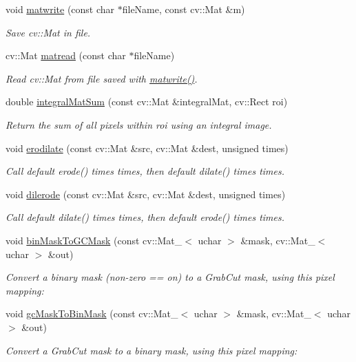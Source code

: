 \begin{DoxyCompactItemize}
void \hyperlink{namespacecvutils_a065c3fe57f6f80cd6a4ba369f3f5a635}{matwrite} (const char $\ast$file\-Name, const cv\-::\-Mat \&m)
\begin{DoxyCompactList}\small\item\em Save cv\-::\-Mat in file. \end{DoxyCompactList}\item 
cv\-::\-Mat \hyperlink{namespacecvutils_ad6c54561b8064273ce92dc34fd8d5c06}{matread} (const char $\ast$file\-Name)
\begin{DoxyCompactList}\small\item\em Read cv\-::\-Mat from file saved with {\ttfamily \hyperlink{namespacecvutils_a065c3fe57f6f80cd6a4ba369f3f5a635}{matwrite()}}. \end{DoxyCompactList}\item 
double \hyperlink{namespacecvutils_a5a05bf26e8f5d1309e36ba3596618c7e}{integral\-Mat\-Sum} (const cv\-::\-Mat \&integral\-Mat, cv\-::\-Rect roi)
\begin{DoxyCompactList}\small\item\em Return the sum of all pixels within {\ttfamily roi} using an integral image. \end{DoxyCompactList}\item 
void \hyperlink{namespacecvutils_adaaa279a13adf2231b2985a5313ef446}{erodilate} (const cv\-::\-Mat \&src, cv\-::\-Mat \&dest, unsigned times)
\begin{DoxyCompactList}\small\item\em Call default {\ttfamily erode()} {\ttfamily times} times, then default {\ttfamily dilate()} {\ttfamily times} times. \end{DoxyCompactList}\item 
void \hyperlink{namespacecvutils_a940f4f576e232256718ac607138d1a03}{dilerode} (const cv\-::\-Mat \&src, cv\-::\-Mat \&dest, unsigned times)
\begin{DoxyCompactList}\small\item\em Call default {\ttfamily dilate()} {\ttfamily times} times, then default {\ttfamily erode()} {\ttfamily times} times. \end{DoxyCompactList}\item 
void \hyperlink{namespacecvutils_a68b814f0c27087d28d1723ba68681858}{bin\-Mask\-To\-G\-C\-Mask} (const cv\-::\-Mat\-\_\-$<$ uchar $>$ \&mask, cv\-::\-Mat\-\_\-$<$ uchar $>$ \&out)
\begin{DoxyCompactList}\small\item\em Convert a binary mask (non-\/zero == on) to a Grab\-Cut mask, using this pixel mapping\-: \end{DoxyCompactList}\item 
void \hyperlink{namespacecvutils_a2a38c5f1b76d38eb5385bf0bd709a5ed}{gc\-Mask\-To\-Bin\-Mask} (const cv\-::\-Mat\-\_\-$<$ uchar $>$ \&mask, cv\-::\-Mat\-\_\-$<$ uchar $>$ \&out)
\begin{DoxyCompactList}\small\item\em Convert a Grab\-Cut mask to a binary mask, using this pixel mapping\-: \end{DoxyCompactList}\end{DoxyCompactItemize}


